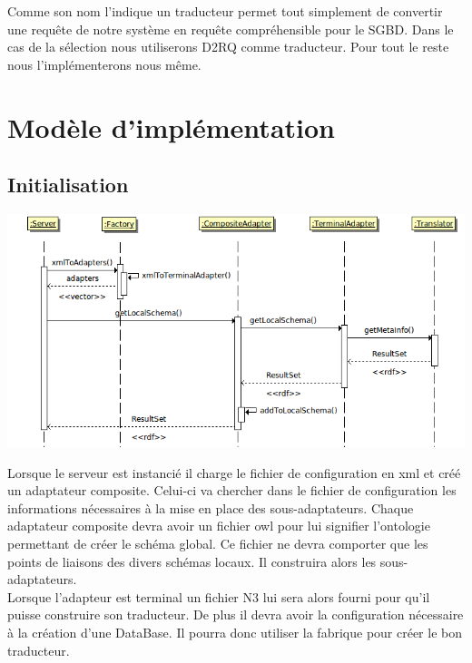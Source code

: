 \documentclass[12pt]{article}
\begin{document}
	Comme son nom l'indique un traducteur permet tout simplement de convertir une requête de notre système en requête compréhensible pour le SGBD. Dans le cas de la sélection nous utiliserons D2RQ comme traducteur. Pour tout le reste nous l'implémenterons nous même.

\newpage

\section{Modèle d'implémentation}

\subsection{Initialisation}

\begin{center}
	\includegraphics[scale=0.60]{images/sequence_init.png}
\end{center}

	Lorsque le serveur est instancié il charge le fichier de configuration en xml et créé un adaptateur composite. Celui-ci va chercher dans le fichier de configuration les informations nécessaires à la mise en place des sous-adaptateurs. Chaque adaptateur composite devra avoir un fichier owl pour lui signifier l'ontologie permettant de créer le schéma global. Ce fichier ne devra comporter que les points de liaisons des divers schémas locaux. Il construira alors les sous-adaptateurs. \\

\indent Lorsque l'adapteur est terminal un fichier N3 lui sera alors fourni pour qu'il puisse construire son traducteur. De plus il devra avoir la configuration nécessaire à la création d'une DataBase. Il pourra donc utiliser la fabrique pour créer le bon traducteur.
\end{document}
